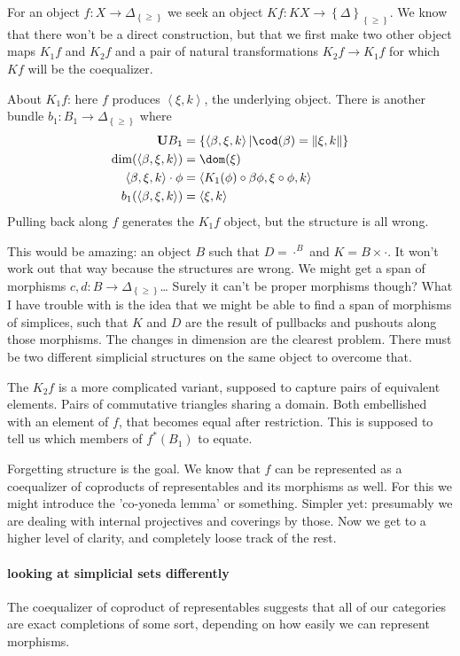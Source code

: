 \documentclass{tac}
\newcommand\set[1]{\left\{#1\right\}}
\newcommand\ri{^*}
\newcommand\of{:}
\newcommand\simplex\Delta
\newcommand\tuplet[1]{\left\langle #1 \right\rangle}
\newcommand\norm[1]{\Vert #1 \Vert}
\newcommand\base{\mathbf{U}}
\begin{document}
For an object $f\of X \to \simplex_{\set\geq}$ we seek an object $Kf\of KX\to \set \simplex_{\set\geq}$. We know that there won't be a direct construction, but that we first make two other object maps $K_1f$ and $K_2f$ and a pair of natural transformations $K_2f\to K_1f$ for which $Kf$ will be the coequalizer.

About $K_1f$: here $f$ produces $\tuplet{\xi,k}$, the underlying object. There is another bundle $b_1\of B_1\to \simplex_{\set\geq}$ where 
\begin{align*}
\base B_1 &= \set{\tuplet{\beta,\xi,k}| \cod(\beta) = \norm{\xi ,k} }\\
\dim(\tuplet{\beta,\xi,k}) &= \dom(\xi) \\
\tuplet{\beta,\xi,k}\cdot\phi &= \tuplet{K_1(\phi)\circ \beta \phi,\xi\circ \phi,k} \\
b_1(\tuplet{\beta,\xi,k}) &= \tuplet{\xi,k}
\end{align*}
Pulling back along $f$ generates the $K_1f$ object, but the structure is all wrong.

This would be amazing: an object $B$ such that $D = \cdot^B$ and $K =B \times \cdot$.
It won't work out that way because the structures are wrong. We might get a span of morphisms $c,d\of B\to \simplex_{\set\geq}$\dots
Surely it can't be proper morphisms though? What I have trouble with is the idea that we might be able to find a span of morphisms of simplices,
such that $K$ and $D$ are the result of pullbacks and pushouts along those morphisms. The changes in dimension are the clearest problem.
There must be two different simplicial structures on the same object to overcome that. 

The $K_2f$ is a more complicated variant, supposed to capture pairs of equivalent elements. Pairs of commutative triangles sharing a domain. Both embellished with an element of $f$, that becomes equal after restriction. This is supposed to tell us which members of $f\ri(B_1)$ to equate.

Forgetting structure is the goal. We know that $f$ can be represented as a coequalizer of coproducts of representables and its morphisms as well.
For this we might introduce the 'co-yoneda lemma' or something. Simpler yet: presumably we are dealing with internal projectives and coverings by those.
Now we get to a higher level of clarity, and completely loose track of the rest.

\paragraph{looking at simplicial sets differently}
The coequalizer of coproduct of representables suggests that all of our categories are exact completions of some sort, depending on how easily we can represent morphisms.
\end{document}
